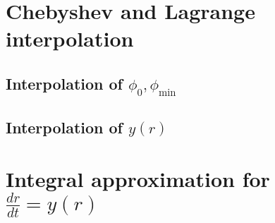 \section{Chebyshev and Lagrange interpolation}



\subsection{Interpolation of \texorpdfstring{$\phi_0,\phi_\mathrm{min}$}{}}

\subsection{Interpolation of \texorpdfstring{$y(r)$}{}}

\section{Integral approximation for \texorpdfstring{$\frac{dr}{dt}=y(r)$}{}}